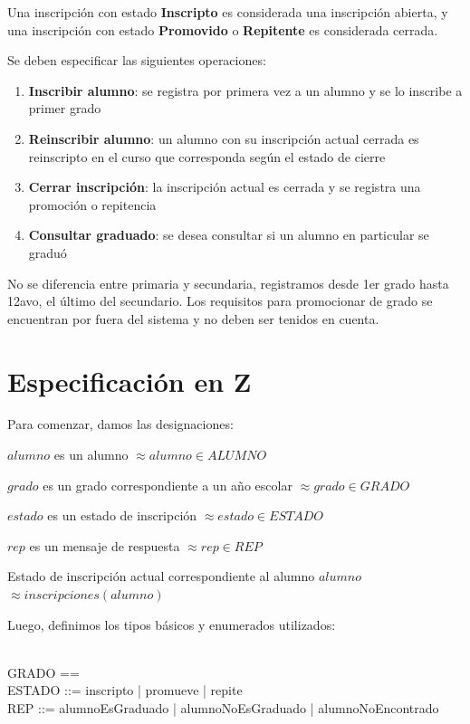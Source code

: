 \documentclass{article}
\newcommand{\desig}[2]{\item #1 $\approx #2$}
\newenvironment{designations}
  {\begin{leftbar}
    \begin{list}{}{\setlength{\labelsep}{0cm}
                   \setlength{\labelwidth}{0cm}
                   \setlength{\listparindent}{0cm}
                   \setlength{\rightmargin}{\leftmargin}}}
  {\end{list}\end{leftbar}}
\begin{document}
Una inscripción con estado \textbf{Inscripto} es considerada una inscripción abierta, y una inscripción con estado \textbf{Promovido} o \textbf{Repitente} es considerada cerrada.

Se deben especificar las siguientes operaciones:

\begin{enumerate}
  \item \textbf{Inscribir alumno}: se registra por primera vez a un alumno y se lo inscribe a primer grado
  
  \item \textbf{Reinscribir alumno}: un alumno con su inscripción actual cerrada es reinscripto en el curso que corresponda según el estado de cierre
  
  \item \textbf{Cerrar inscripción}: la inscripción actual es cerrada y se registra una promoción o repitencia
  
  \item \textbf{Consultar graduado}: se desea consultar si un alumno en particular se graduó
\end{enumerate}

No se diferencia entre primaria y secundaria, registramos desde 1er grado hasta 12avo, el último del secundario. Los requisitos para promocionar de grado se encuentran por fuera del sistema y no deben ser tenidos en cuenta.

\section{Especificación en Z}

Para comenzar, damos las designaciones:
\begin{designations}
  \desig{$alumno$ es un alumno}{alumno \in ALUMNO}
  \desig{$grado$ es un grado correspondiente a un año escolar}{grado \in GRADO}
  \desig{$estado$ es un estado de inscripción}{estado \in ESTADO}
  \desig{$rep$ es un mensaje de respuesta}{rep \in REP}
  \desig{Estado de inscripción actual correspondiente al alumno $alumno$}{inscripciones(alumno)}
\end{designations}

Luego, definimos los tipos básicos y enumerados utilizados:
\begin{zed}
  [ALUMNO] \\
  GRADO == \nat \\
  ESTADO ::= inscripto | promueve | repite \\
  REP ::= alumnoEsGraduado | alumnoNoEsGraduado | alumnoNoEncontrado
\end{zed}
\end{document}
